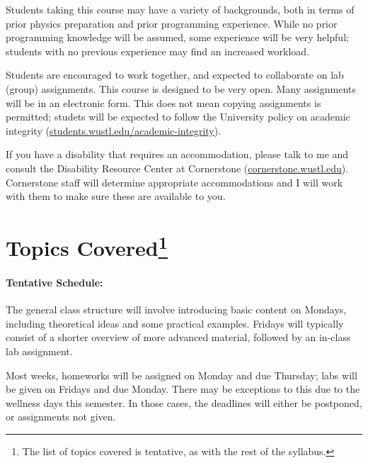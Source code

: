 \documentclass[11pt]{article}
\begin{document}
Students taking this course may have a variety of backgrounds, both in terms of prior physics preparation
and prior programming experience. While no prior programming knowledge will be assumed, some experience will
be very helpful; students with no previous experience may find an increased workload.

Students are encouraged to work together, and expected to collaborate on lab (group) assignments.
This course is designed to be very open. Many assignments will be in an electronic form.
This does not mean copying assignments is permitted; studets will be expected to follow the
University policy on academic integrity
(\href{https://students.wustl.edu/academic-integrity/}{students.wustl.edu/academic-integrity}).

If you have a disability that requires an accommodation, please talk to me and consult
the Disability Resource Center at Cornerstone (\href{https://cornerstone.wustl.edu}{cornerstone.wustl.edu}).
Cornerstone staff will determine appropriate accommodations and I will work with them to make sure these are
available to you. 

\section*{Topics Covered\footnote{The list of topics covered is tentative, as with the rest of the syllabus.}}


\paragraph*{Tentative Schedule:}

The general class structure will involve introducing basic content on Mondays, including theoretical ideas and
some practical examples. Fridays will typically consist of a shorter overview of more advanced material, followed
by an in-class lab assignment.

Most weeks, homeworks will be assigned on Monday and due Thursday; labs will be given on Fridays and due Monday.
There may be exceptions to this due to the wellness days this semester. In those cases, the deadlines will either
be postponed, or assignments not given.
\end{document}
